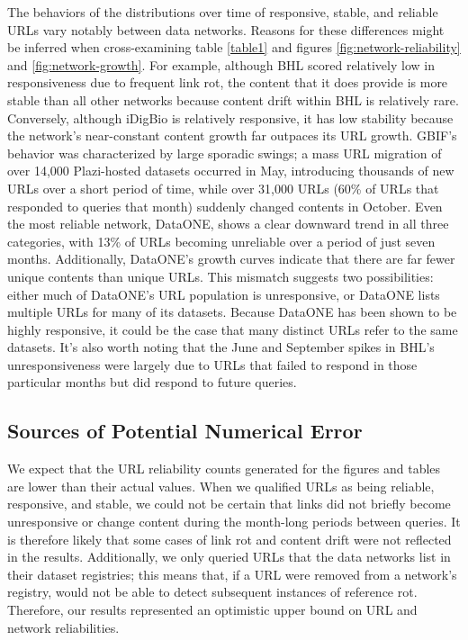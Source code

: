 The behaviors of the distributions over time of responsive, stable, and reliable URLs vary notably between data networks. Reasons for these differences might be inferred when cross-examining table \ref{table1} and figures \ref{fig:network-reliability} and \ref{fig:network-growth}. For example, although BHL scored relatively low in responsiveness due to frequent link rot, the content that it does provide is more stable than all other networks because content drift within BHL is relatively rare. Conversely, although iDigBio is relatively responsive, it has low stability because the network's near-constant content growth far outpaces its URL growth. GBIF's behavior was characterized by large sporadic swings; a mass URL migration of over 14,000 Plazi-hosted datasets occurred in May, introducing thousands of new URLs over a short period of time, while over 31,000 URLs (60\% of URLs that responded to queries that month) suddenly changed contents in October. Even the most reliable network, DataONE, shows a clear downward trend in all three categories, with 13\% of URLs becoming unreliable over a period of just seven months. Additionally, DataONE's growth curves indicate that there are far fewer unique contents than unique URLs. This mismatch suggests two possibilities: either much of DataONE's URL population is unresponsive, or DataONE lists multiple URLs for many of its datasets. Because DataONE has been shown to be highly responsive, it could be the case that many distinct URLs refer to the same datasets. It's also worth noting that the June and September spikes in BHL's unresponsiveness were largely due to URLs that failed to respond in those particular months but did respond to future queries.

\subsection*{Sources of Potential Numerical Error}
We expect that the URL reliability counts generated for the figures and tables are lower than their actual values. When we qualified URLs as being reliable, responsive, and stable, we could not be certain that links did not briefly become unresponsive or change content during the month-long periods between queries. It is therefore likely that some cases of link rot and content drift were not reflected in the results. Additionally, we only queried URLs that the data networks list in their dataset registries; this means that, if a URL were removed from a network's registry, would not be able to detect subsequent instances of reference rot. Therefore, our results represented an optimistic upper bound on URL and network reliabilities.


